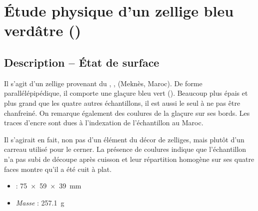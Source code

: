 
\chapter{Étude physique d'un zellige bleu verdâtre ()}

\section{Description -- État de surface}

Il s'agit d'un zellige provenant du \PaM, , (Meknès, 
Maroc). De forme parallélépipédique, il comporte une glaçure bleu vert 
(). Beaucoup plus épais et plus grand que les quatre 
autres échantillons, il est aussi le seul à ne pas être chanfreiné. 
On remarque également des coulures de la glaçure sur ses bords. Les 
traces d'encre sont dues à l'indexation de l'échantillon au Maroc.

Il s'agirait en fait, non pas d'un élément du décor de zelliges, mais 
plutôt d'un carreau utilisé pour le cerner. La présence de coulures 
indique que l'échantillon n'a pas subi de découpe après cuisson et 
leur répartition homogène sur ses quatre faces montre qu'il a été cuit 
à plat.

\begin{itemize}
  \item \DimText : \SI{75x59x39}{\mm}
  \item \emph{Masse} : \SI{257.1}{\g}
\end{itemize}

